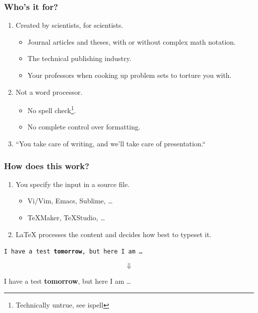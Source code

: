 \documentclass{beamer}
\begin{document}
\begin{frame}
    \frametitle{Who's it for?}
    \begin{enumerate}
        \item<1-> Created by scientists, for scientists.
            \begin{itemize}
                \item Journal articles and theses, with or without complex
                    math notation.
                \item The technical publishing industry.
                \item Your professors when cooking up problem sets to torture
                    you with.
            \end{itemize}
        \item<2-> Not a word processor.
            \begin{itemize}
                \item No spell check\footnote{Technically untrue, see
                        ispell}.
                \item No complete control over formatting.
            \end{itemize}
        \item<3-> ``You take care of writing, and we'll take care of
            presentation.``
    \end{enumerate}
\end{frame}

\begin{frame}
    \frametitle{How does this work?}
    \begin{enumerate}
        \item You specify the input in a source file.
            \begin{itemize}
                \item Vi/Vim, Emacs, Sublime, \dots
                \item TeXMaker, TeXStudio, \dots
            \end{itemize}
        \item LaTeX processes the content and decides how best to typeset it.
    \end{enumerate}
    \vspace{0.5cm}
    \begin{framed}
        \texttt{I have a test \textbf{tomorrow}, but here I
            am \dots}
    \end{framed}
    \[
        \Downarrow
    \]
    \begin{framed}
        I have a test \textbf{tomorrow}, but here I am \dots
    \end{framed}
\end{frame}
\end{document}
